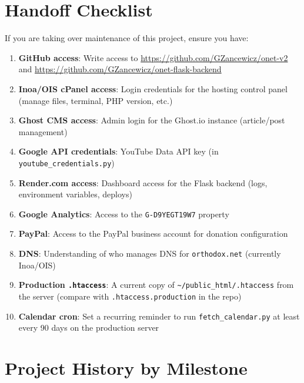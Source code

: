 \documentclass[12pt]{article}
\begin{document}
\section{Handoff Checklist}

If you are taking over maintenance of this project, ensure you have:

\begin{enumerate}
    \item \textbf{GitHub access}: Write access to \url{https://github.com/GZancewicz/onet-v2} and \url{https://github.com/GZancewicz/onet-flask-backend}
    \item \textbf{Inoa/OIS cPanel access}: Login credentials for the hosting control panel (manage files, terminal, PHP version, etc.)
    \item \textbf{Ghost CMS access}: Admin login for the Ghost.io instance (article/post management)
    \item \textbf{Google API credentials}: YouTube Data API key (in \texttt{youtube\_credentials.py})
    \item \textbf{Render.com access}: Dashboard access for the Flask backend (logs, environment variables, deploys)
    \item \textbf{Google Analytics}: Access to the \texttt{G-D9YEGT19W7} property
    \item \textbf{PayPal}: Access to the PayPal business account for donation configuration
    \item \textbf{DNS}: Understanding of who manages DNS for \texttt{orthodox.net} (currently Inoa/OIS)
    \item \textbf{Production \texttt{.htaccess}}: A current copy of \texttt{\textasciitilde/public\_html/.htaccess} from the server (compare with \texttt{.htaccess.production} in the repo)
    \item \textbf{Calendar cron}: Set a recurring reminder to run \texttt{fetch\_calendar.py} at least every 90 days on the production server
\end{enumerate}

\newpage
\appendix
\section{Project History by Milestone}
\label{app:history}
\end{document}

